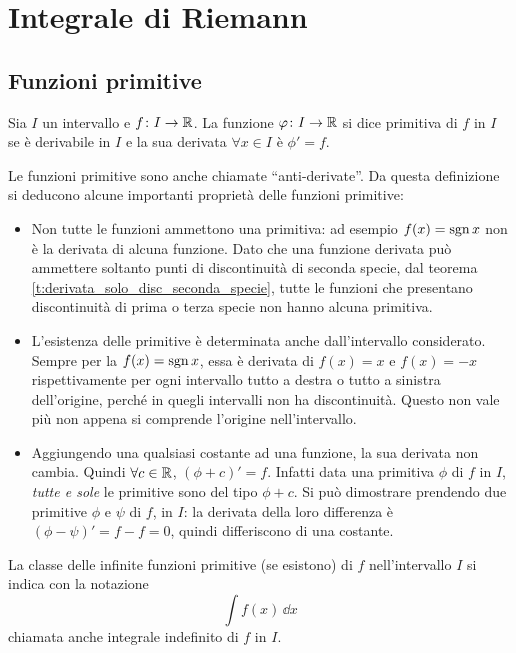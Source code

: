 \chapter{Integrale di Riemann}
\section{Funzioni primitive}
\begin{definizione} \label{d:primitiva}
Sia $I$ un intervallo e $f\colon I\to\mathbb{R}$. La funzione $\varphi\colon I\to\mathbb{R}$ si dice primitiva di $f$ in $I$ se è derivabile in $I$ e la sua derivata $\forall x\in I$ è $\phi'=f$.
\end{definizione}
Le funzioni primitive sono anche chiamate ``anti-derivate''. Da questa definizione si deducono alcune importanti proprietà delle funzioni primitive:
\begin{itemize}
\item Non tutte le funzioni ammettono una primitiva: ad esempio $f(x)=\operatorname{sgn} x$ non è la derivata di alcuna funzione. Dato che una funzione derivata può ammettere soltanto punti di discontinuità di seconda specie, dal teorema \ref{t:derivata_solo_disc_seconda_specie}, tutte le funzioni che presentano discontinuità di prima o terza specie non hanno alcuna primitiva.
\item L'esistenza delle primitive è determinata anche dall'intervallo considerato. Sempre per la $f(x)=\operatorname{sgn} x$, essa è derivata di $f(x)=x$ e $f(x)=-x$ rispettivamente per ogni intervallo tutto a destra o tutto a sinistra dell'origine, perché in quegli intervalli non ha discontinuità. Questo non vale più non appena si comprende l'origine nell'intervallo.
\item Aggiungendo una qualsiasi costante ad una funzione, la sua derivata non cambia. Quindi $\forall c\in\mathbb{R}$, $(\phi+c)'=f$. Infatti data una primitiva $\phi$ di $f$ in $I$, \emph{tutte e sole} le primitive sono del tipo $\phi+c$. Si può dimostrare prendendo due primitive $\phi$ e $\psi$ di $f$, in $I$: la derivata della loro differenza è $(\phi-\psi)'=f-f=0$, quindi differiscono di una costante.
\end{itemize}
La classe delle infinite funzioni primitive (se esistono) di $f$ nell'intervallo $I$ si indica con la notazione
\[
\int f(x)\,\dd x
\]
chiamata anche integrale indefinito di $f$ in $I$.

